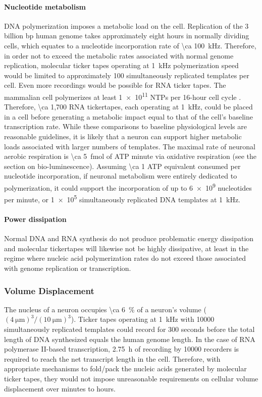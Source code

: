 \paragraph{Nucleotide metabolism}
DNA polymerization imposes a metabolic load on the cell.
Replication of the 3 billion bp human genome takes approximately eight hours in normally dividing cells, which equates to a nucleotide incorporation rate of \SI{\ca 100}{\kHz}.
Therefore, in order not to exceed the metabolic rates associated with normal genome replication, molecular ticker tapes operating at \SI{1}{\kHz} polymerization speed~\cite{kelman95} would be limited to approximately 100 simultaneously replicated templates per cell.
Even more recordings would be possible for RNA ticker tapes.
The mammalian cell polymerizes at least \num{1e11} NTPs per 16-hour cell cycle \cite{jackson00}.
Therefore, \num{\ca 1,700} RNA tickertapes, each operating at \SI{1}{\kHz}, could be placed in a cell before generating a metabolic impact equal to that of the cell's baseline transcription rate.
While these comparisons to baseline physiological levels are reasonable guidelines, it is likely that a neuron can support higher metabolic loads associated with larger numbers of templates.
The maximal rate of neuronal aerobic respiration is \SI{\ca 5}{\femto\mole} of ATP minute via oxidative respiration (see the section on bio-luminescence). Assuming \num{\ca 1} ATP equivalent consumed per nucleotide incorporation, if neuronal metabolism were entirely dedicated to polymerization, it could support the incorporation of up to \num{6e9} nucleotides per minute, or \num{1e5} simultaneously replicated DNA templates at \SI{1}{\kHz}. %

\paragraph{Power dissipation}
Normal DNA and RNA synthesis do not produce problematic energy dissipation and molecular tickertapes will likewise not be highly dissipative, at least in the regime where nucleic acid polymerization rates do not exceed those associated with genome replication or transcription.

\subsubsection{Volume Displacement}

The nucleus of a neuron occupies \SI{\ca 6}{\percent} of a neuron's volume ($(\SI{4}{\um})^3/(\SI{10}{\um})^3$).
Ticker tapes operating at \SI{1}{\kHz} with \num{10000} simultaneously replicated templates could record for \num{300} seconds before the total length of DNA synthesized equals the human genome length.
In the case of RNA polymerase II-based transcription, \SI{2.75}{\hour} of recording by \num{10000} recorders is required to reach the net transcript length in the cell.
Therefore, with appropriate mechanisms to fold/pack the nucleic acids generated by molecular ticker tapes, they would not impose unreasonable requirements on cellular volume displacement over minutes to hours.

